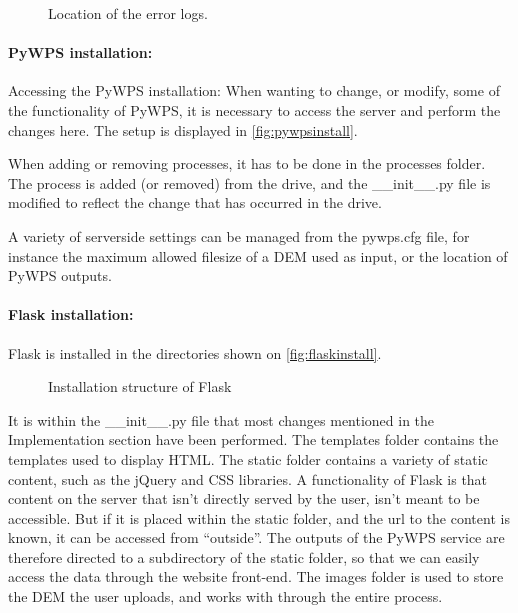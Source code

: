 \begin{figure}[h]
\caption{Location of the error logs.}
\label{fig:anal_struct}
\end{figure}

\paragraph{PyWPS installation:}Accessing the PyWPS installation: When wanting to change, or modify, some of the functionality of PyWPS, it is necessary to access the server and perform the changes here. The setup is displayed in \autoref{fig:pywpsinstall}. 

\begin{figure}[h]
\label{fig:pywpsinstall}
\end{figure}

When adding or removing processes, it has to be done in the processes folder. The process is added (or removed) from the drive, and the \_\_init\_\_.py file is modified to reflect the change that has occurred in the drive.

A variety of serverside settings can be managed from the pywps.cfg file, for instance the maximum allowed filesize of a DEM used as input, or the location of PyWPS outputs.

\paragraph{Flask installation:}Flask is installed in the directories shown on \autoref{fig:flaskinstall}.\\

\begin{figure}[h]
\caption{Installation structure of Flask}
\label{fig:flaskinstall}
\end{figure}

It is within the \_\_init\_\_.py file that most changes mentioned in the Implementation section have been performed. The templates folder contains the templates used to display HTML. The static folder contains a variety of static content, such as the jQuery and CSS libraries. A functionality of Flask is that content on the server that isn't directly served by the user, isn't meant to be accessible. But if it is placed within the static folder, and the url to the content is known, it can be accessed from “outside”. The outputs of the PyWPS service are therefore directed to a subdirectory of the static folder, so that we can easily access the data through the website front-end.
The images folder is used to store the DEM the user uploads, and works with through the entire process.\\

